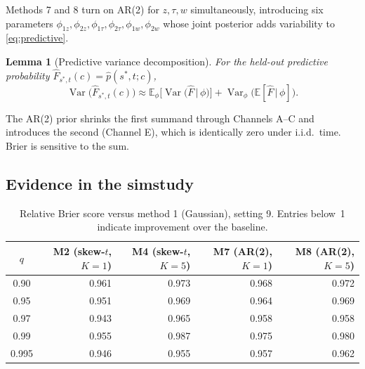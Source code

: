\documentclass[11pt]{article}
\newtheorem{lemma}{Lemma}
\theoremstyle{definition}
\newcommand{\E}{\mathbb{E}}
\newcommand{\Var}{\operatorname{Var}}
\newcommand{\given}{\,\vert\,}
\begin{document}
\begin{description}[leftmargin=2em, itemsep=0.25em]
  \item[Channel E (cost): posterior on $\phi$.] Methods 7 and 8 turn
    on AR(2) for $z, \tau, w$ simultaneously, introducing six
    parameters $\phi_{1z}, \phi_{2z}, \phi_{1\tau}, \phi_{2\tau},
    \phi_{1w}, \phi_{2w}$ whose joint posterior adds variability to
    \eqref{eq:predictive}.
\end{description}

\begin{lemma}[Predictive variance decomposition]
\label{lem:variance}
For the held-out predictive probability
$\hat F_{s^*, t}(c) = \hat p(s^*, t; c)$,
\begin{equation}
  \Var\!\big(\hat F_{s^*, t}(c)\big)
    \approx \E_\phi\!\big[\Var\!\big(\hat F \given \phi\big)\big]
          + \Var_\phi\!\big(\E[\hat F \given \phi]\big).
  \label{eq:variance-decomp}
\end{equation}
\end{lemma}

The AR(2) prior shrinks the first summand through Channels A--C and
introduces the second (Channel E), which is identically zero under
i.i.d.\ time. Brier is sensitive to the sum.

\subsection{Evidence in the simstudy}
\label{sec:evidence}

\begin{table}[h]
\centering
\caption{Relative Brier score versus method 1 (Gaussian), setting 9.
         Entries below~1 indicate improvement over the baseline.}
\label{tab:rel-brier}
\begin{tabular}{c r r r r}
\toprule
$q$ & M2 (skew-$t$, $K{=}1$) & M4 (skew-$t$, $K{=}5$)
    & M7 (AR(2), $K{=}1$)    & M8 (AR(2), $K{=}5$) \\
\midrule
0.90  & 0.961 & 0.973 & 0.968 & 0.972 \\
0.95  & 0.951 & 0.969 & 0.964 & 0.969 \\
0.97  & 0.943 & 0.965 & 0.958 & 0.958 \\
0.99  & 0.955 & 0.987 & 0.975 & 0.980 \\
0.995 & 0.946 & 0.955 & 0.957 & 0.962 \\
\bottomrule
\end{tabular}
\end{table}
\end{document}
